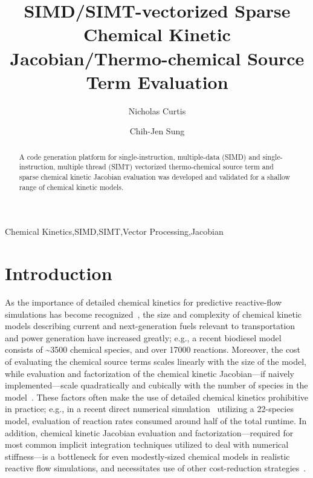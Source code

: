 \documentclass[12pt,number,sort&compress,preprint]{elsarticle}
\title{SIMD\slash SIMT-vectorized Sparse Chemical Kinetic Jacobian\slash Thermo-chemical Source Term Evaluation}
\author[1]{Nicholas Curtis\corref{corr}}
\author[1]{Chih-Jen Sung}
\begin{document}
\begin{frontmatter}

\begin{abstract} %
A code generation platform for single-instruction, multiple-data (SIMD) and single-instruction, multiple thread (SIMT) vectorized thermo-chemical source term and sparse chemical kinetic Jacobian evaluation was developed and validated for a shallow range of chemical kinetic models.
\end{abstract}

\begin{keyword}
    Chemical Kinetics\sep SIMD\sep SIMT\sep Vector Processing\sep Jacobian
\end{keyword}

\end{frontmatter}

\section{Introduction}
%

As the importance of detailed chemical kinetics for predictive reactive-flow simulations has become recognized~\cite{LU2009192}, the size and complexity of chemical kinetic models describing current and next-generation fuels relevant to transportation and power generation have increased greatly; e.g., a recent biodiesel model~\cite{WESTBROOK2011742} consists of \textasciitilde\num{3500} chemical species, and over \num{17000} reactions.
Moreover, the cost of evaluating the chemical source terms scales linearly with the size of the model, while evaluation and factorization of the chemical kinetic Jacobian---if naively implemented---scale quadratically and cubically with the number of species in the model~\cite{LU2009192}.
These factors often make the use of detailed chemical kinetics prohibitive in practice; e.g., in a recent direct numerical simulation~\cite{Spafford:2010aa} utilizing a 22-species model, evaluation of reaction rates consumed around half of the total runtime.
In addition, chemical kinetic Jacobian evaluation and factorization---required for most common implicit integration techniques utilized to deal with numerical stiffness---is a bottleneck for even modestly-sized chemical models in realistic reactive flow simulations, and necessitates use of other cost-reduction strategies~\cite{LU2009192}.
\end{document}
